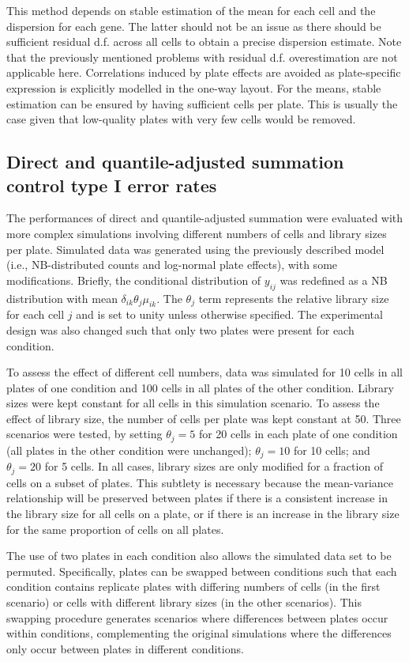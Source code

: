 \documentclass{article}
\begin{document}
This method depends on stable estimation of the mean for each cell and the dispersion for each gene.
The latter should not be an issue as there should be sufficient residual d.f. across all cells to obtain a precise dispersion estimate.
Note that the previously mentioned problems with residual d.f. overestimation are not applicable here.
Correlations induced by plate effects are avoided as plate-specific expression is explicitly modelled in the one-way layout.
For the means, stable estimation can be ensured by having sufficient cells per plate.
This is usually the case given that low-quality plates with very few cells would be removed.

\subsection{Direct and quantile-adjusted summation control type I error rates}
The performances of direct and quantile-adjusted summation were evaluated with more complex simulations involving different numbers of cells and library sizes per plate.
Simulated data was generated using the previously described model (i.e., NB-distributed counts and log-normal plate effects), with some modifications.
Briefly, the conditional distribution of $y_{ij}$ was redefined as a NB distribution with mean $\delta_{ik}\theta_{j}\mu_{ik}$.
The $\theta_{j}$ term represents the relative library size for each cell $j$ and is set to unity unless otherwise specified.
The experimental design was also changed such that only two plates were present for each condition.

To assess the effect of different cell numbers, data was simulated for 10 cells in all plates of one condition and 100 cells in all plates of the other condition.
Library sizes were kept constant for all cells in this simulation scenario.
To assess the effect of library size, the number of cells per plate was kept constant at 50.
Three scenarios were tested, by setting $\theta_j=5$ for 20 cells in each plate of one condition (all plates in the other condition were unchanged);
    $\theta_j=10$ for 10 cells; and $\theta_j=20$ for 5 cells.
In all cases, library sizes are only modified for a fraction of cells on a subset of plates. 
This subtlety is necessary because the mean-variance relationship will be preserved between plates if there is a consistent increase in the library size for all cells on a plate, 
    or if there is an increase in the library size for the same proportion of cells on all plates.

The use of two plates in each condition also allows the simulated data set to be permuted.
Specifically, plates can be swapped between conditions such that each condition contains replicate plates with differing numbers of cells (in the first scenario)
    or cells with different library sizes (in the other scenarios).
This swapping procedure generates scenarios where differences between plates occur within conditions, 
    complementing the original simulations where the differences only occur between plates in different conditions.
\end{document}

